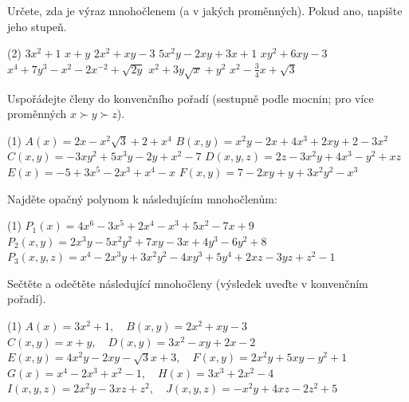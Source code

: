 \documentclass[12pt,a4paper]{article}
\begin{document}
\setcounter{section}{2}
\begin{exercise}
    Určete, zda je výraz mnohočlenem (a v jakých proměnných). Pokud ano, napište jeho stupeň.
    \begin{tasks}(2)
        \task $3x^2 + 1$
        \task $x+y$
        \task $2x^2+xy-3$
        \task $5x^2y - 2xy + 3x + 1$
        \task $xy^2 + 6xy - 3$
        \task $x^4 + 7y^3 - x^2 - 2x^{-2} + \sqrt{2y}$
        \task $x^2+3y\sqrt{x}+y^2$
        \task $x^2-\tfrac{3}{4}x+\sqrt{3}$
    \end{tasks}
\end{exercise}


\begin{exercise}
    Uspořádejte členy do konvenčního pořadí (sestupně podle mocnin; pro více proměnných $x \succ y \succ z$).
    \begin{tasks}(1)
        \task $A(x) = 2x - x^2\sqrt{3} + 2 + x^4$
        \task $B(x,y) = x^2y - 2x + 4x^3 + 2xy + 2 - 3x^2$
        \task $C(x,y) = -3xy^2 + 5x^3y - 2y + x^2 - 7$
        \task $D(x,y,z) = 2z - 3x^2y + 4x^3 - y^2 + xz$
        \task $E(x) = -5 + 3x^5 - 2x^3 + x^4 - x$
        \task $F(x,y) = 7 - 2xy + y + 3x^2y^2 - x^3$
    \end{tasks}
\end{exercise}


\begin{exercise}
    Najděte opačný polynom k následujícím mnohočlenům:
    \begin{tasks}(1)
        \task $P_1(x) = 4x^6 - 3x^5 + 2x^4 - x^3 + 5x^2 - 7x + 9$
        \task $P_2(x,y) = 2x^3y - 5x^2y^2 + 7xy - 3x + 4y^3 - 6y^2 + 8$
        \task $P_3(x,y,z) = x^4 - 2x^3y + 3x^2y^2 - 4xy^3 + 5y^4 + 2xz - 3yz + z^2 - 1$
    \end{tasks}
\end{exercise}


\begin{exercise}
    Sečtěte a odečtěte následující mnohočleny (výsledek uveďte v konvenčním pořadí).
    \begin{tasks}(1)
        \task $A(x)=3x^2+1,\quad B(x,y)=2x^2+xy-3$
        \task $C(x,y)=x+y,\quad D(x,y)=3x^2-xy+2x-2$
        \task $E(x,y)=4x^2y - 2xy - \sqrt{3}x + 3,\quad F(x,y)=2x^2y+5xy-y^2+1$
        \task $G(x)=x^4-2x^3+x^2-1,\quad H(x)=3x^3+2x^2-4$
        \task $I(x,y,z)=2x^2y-3xz+z^2,\quad J(x,y,z)=-x^2y+4xz-2z^2+5$
    \end{tasks}
\end{exercise}
\end{document}
